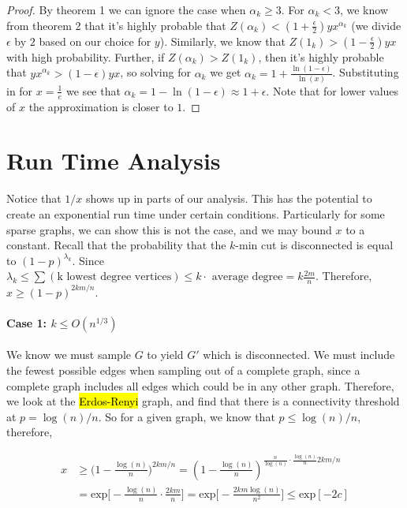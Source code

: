 \documentclass{acm_proc_article-sp}
\begin{document}
\begin{proof}
By theorem 1 we can ignore the case when $\alpha_k \geq 3$. For $\alpha_k < 3$, we know from theorem 2 that it's highly probable that $Z(\alpha_k) < (1+\frac{\epsilon}{2})yx^{\alpha_k}$ (we divide $\epsilon$ by $2$ based on our choice for $y$).
Similarly, we know that $Z(1_k) > (1-\frac{\epsilon}{2}) yx$ with high probability. Further, if $Z(\alpha_k) > Z(1_k)$, then it's highly probable that $yx^{\alpha_k} > (1-\epsilon) yx$, so solving for $\alpha_k$ we get $\alpha_k = 1 + \frac{\ln(1-\epsilon)}{\ln(x)}$. Substituting in for $x = \frac{1}{e}$ we see that $\alpha_k = 1 - \ln(1 - \epsilon) \approx 1+\epsilon$. Note that for lower values of $x$ the approximation is closer to $1$.
\end{proof}

\section{Run Time Analysis}

Notice that $1/x$ shows up in parts of our analysis. This has the potential to create an exponential run time under certain conditions. Particularly for some sparse graphs, we can show this is not the case, and we may bound $x$ to a constant. Recall that the probability that the $k$-min cut is disconnected is equal to $(1-p)^{\lambda_k}$. Since 
$\lambda_k \leq \sum (\text{k lowest degree vertices}) \leq k \cdot \text{ average degree} = k \frac{2m}{n}$. Therefore, 
$x \geq (1-p)^{2km/n}$.

\paragraph{Case 1: $k \leq O(n^{1/3})$}
We know we must sample $G$ to yield $G'$ which is disconnected. We must include the fewest possible edges when sampling out of a complete graph, since a complete graph includes all edges which could be in any other graph. Therefore, we look at the \hl{Erdos-Renyi} graph, and find that there is a connectivity threshold at $p = \log(n)/n$. So for a given graph, we know that $p \leq \log(n)/n$, therefore, 

\begin{align*}
x &\geq \big(1-\frac{\log(n)}{n}\big)^{2km/n} = (1-\frac{\log(n)}{n})^{\frac{n}{\log(n)} \cdot \frac{\log(n)}{n} 2km/n} \\ &= \textrm{exp} \bigg[- \frac{\log(n)}{n} \cdot \frac{2km}{n}\bigg] = \textrm{exp}\bigg[-\frac{2km \log(n)}{n^2}\bigg] \leq \textrm{exp}[-2c]
\end{align*}
\end{document}
